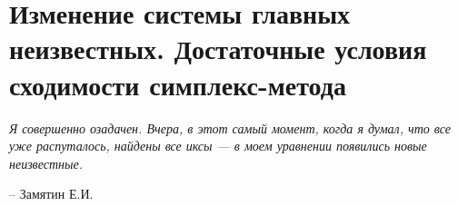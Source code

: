 \chapter{Изменение системы главных неизвестных. Достаточные условия сходимости симплекс-метода}
\label{cha:15}

\epigraph{
	\textit{Я совершенно озадачен. Вчера, в этот самый момент, когда я думал, что все уже распуталось, найдены все иксы — в моем уравнении появились новые неизвестные.}}
{-- Замятин Е.И.}







